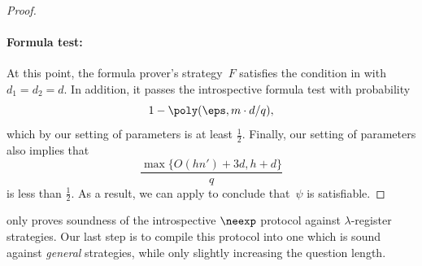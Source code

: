 \begin{proof}
\paragraph{Formula test:}
At this point, the formula prover's strategy~$F$ satisfies the condition in  with $d_1 = d_2 = d$.
In addition, it passes the introspective formula test with probability
\begin{equation}\label{eq:formula-success-probability}
1-\poly(\eps, m \cdot d/q),
\end{equation}
which by our setting of parameters is at least $\tfrac{1}{2}$.
Finally, our setting of parameters also implies that
\begin{equation}\label{eq:other-expression-dont-even-know-what-to-call-this}
\frac{\max\{O(h n') + 3d, h + d\}}{q}
\end{equation}
is less than $\tfrac{1}{2}$.
As a result, we can apply  to conclude that~$\psi$ is satisfiable.
\end{proof}

 only proves soundness of the introspective $\neexp$ protocol against $\lambda$-register strategies.
Our last step is to compile this protocol into one which is sound against \emph{general} strategies,
while only slightly increasing the question length.

